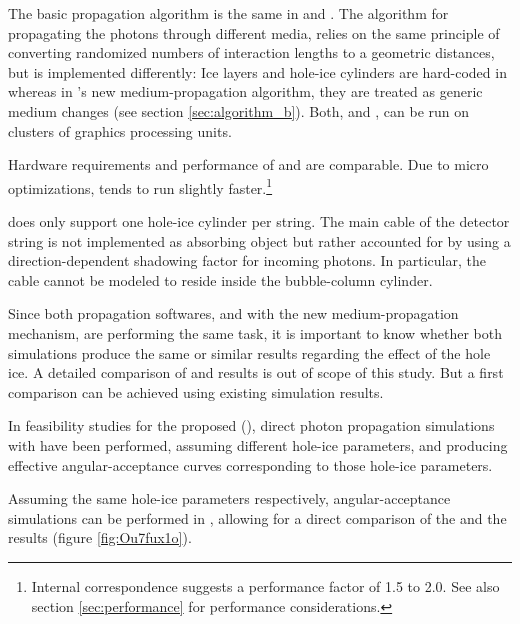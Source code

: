 The basic propagation algorithm is the same in \ppc and \clsim. The algorithm for propagating the photons through different media, relies on the same principle of converting randomized numbers of interaction lengths to a geometric distances, but is implemented differently: Ice layers and hole-ice cylinders are hard-coded in \ppc whereas in \clsim's new medium-propagation algorithm, they are treated as generic medium changes (see section \ref{sec:algorithm_b}). Both, \ppc and \clsim, can be run on clusters of graphics processing units. \cite{ppcpaper, ppcsource, ppcforhumans, clsimsource}

Hardware requirements and performance of \ppc and \clsim are comparable. Due to micro optimizations, \ppc tends to run slightly faster.\footnote{Internal correspondence suggests a performance factor of 1.5 to 2.0. See also section \ref{sec:performance} for performance considerations.}

\ppc does only support one hole-ice cylinder per string. The main cable of the detector string is not implemented as absorbing object but rather accounted for by using a direction-dependent shadowing factor for incoming photons. \cite{ppcsource, ppcforhumans}
In particular, the cable cannot be modeled to reside inside the bubble-column cylinder. \cite{martinspicehddard}

Since both propagation softwares, \ppc and \clsim with the new medium-propagation mechanism, are performing the same task, it is important to know whether both simulations produce the same or similar results regarding the effect of the hole ice. A detailed comparison of \ppc and \clsim results is out of scope of this study. But a first comparison can be achieved using existing \ppc simulation results.\followup

In feasibility studies for the proposed  (), direct photon propagation simulations with \ppc have been performed, assuming different hole-ice parameters, and producing effective angular-acceptance curves corresponding to those hole-ice parameters. \cite{pocam, icrc17pocam}

Assuming the same hole-ice parameters respectively, angular-acceptance simulations can be performed in \clsim, allowing for a direct comparison of the \ppc and the \clsim results (figure \ref{fig:Ou7fux1o}).

